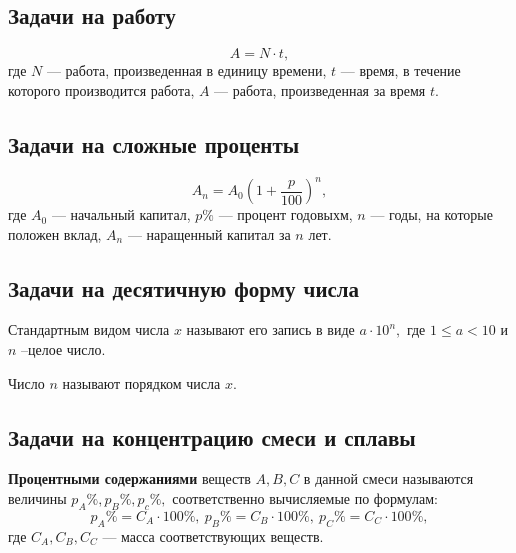 \documentclass[a4paper, 12pt]{article}
\begin{document}
\subsection{Задачи на работу}
$$A=N\cdot t,$$
где $N$ --- работа, произведенная в единицу времени, $t$ --- время, в течение которого производится работа, $A$ --- работа, произведенная за время $t.$
\subsection{Задачи на сложные проценты}
$$A_n=A_0\left( 1+\frac{p}{100}\right)^n ,$$
где $A_0$ --- начальный капитал, $p\%$ --- процент годовыхм, $n$ --- годы, на которые положен вклад, $A_n$ --- наращенный капитал за $n$ лет. 
\subsection{Задачи на десятичную форму числа}
Стандартным видом числа $x$ называют его запись в виде $a\cdot 10^n,$ где $1\le a < 10$ и $n$ --целое число.

Число $n$ называют порядком числа $x.$ 

\subsection{Задачи на концентрацию смеси и сплавы}
\textbf{Процентными содержаниями} веществ $A, B, C$ в данной смеси называются величины $p_A\%, p_B\%, p_c\%,$ соответственно вычисляемые по формулам:
$$
p_A\%=C_A\cdot 100\%,\  p_B\%=C_B\cdot 100\%,\ p_C\%=C_C\cdot 100\%,
$$
где $C_A, C_B, C_C$ --- масса соответствующих веществ.
\end{document}
